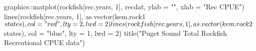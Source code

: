 \begin{Schunk}
\begin{Sinput}
 graphics::matplot(rockfish[rec.years, 1], recdat, ylab = "", xlab = "Rec CPUE")
 lines(rockfish[rec.years, 1], as.vector(kem.rock1$states), col = "red", lty = 2, lwd = 2)
 lines(rockfish[rec.years, 1], as.vector(kem.rock2$states), col = "blue", lty = 1, lwd = 2)
 title("Puget Sound Total Rockfish Recreational CPUE data")
\end{Sinput}
\end{Schunk}
